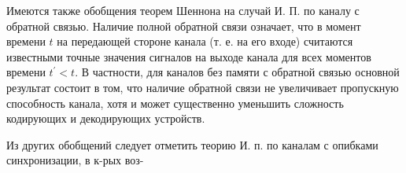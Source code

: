 \documentclass[10pt]{article}
\begin{document}
Имеются также обобщения теорем Шеннона на случай И. П. по каналу с обратной связью. Наличие полной обратной связи означает, что в момент времени $t$ на передающей стороне канала (т. е. на его входе) считаются известными точные значения сигналов на выходе канала для всех моментов времени $t^{\prime}<t$. В частности, для каналов без памяти с обратной связью основной результат состоит в том, что наличие обратной связи не увеличивает пропускную способность канала, хотя и может существенно уменьшить сложность кодирующих и декодирующих устройств.



Из других обобщений следует отметить теорию И. п. по каналам с опибками синхронизации, в к-рых воз-
\end{document}
